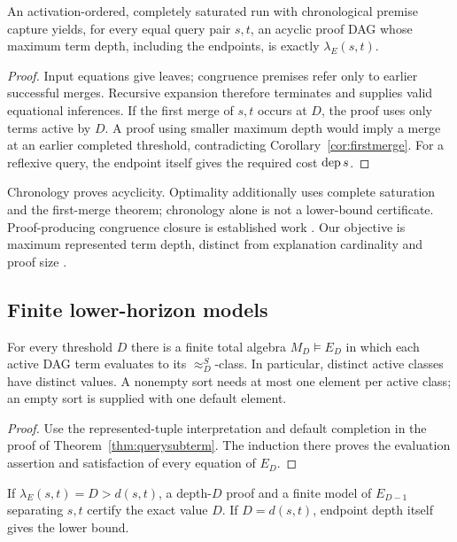 \begin{proposition}\label{prop:proofdag}
An activation-ordered, completely saturated run with chronological premise capture yields, for every equal query pair $s,t$, an acyclic proof DAG whose maximum term depth, including the endpoints, is exactly $\lambda_E(s,t)$.
\end{proposition}
\begin{proof}
Input equations give leaves; congruence premises refer only to earlier successful merges. Recursive expansion therefore terminates and supplies valid equational inferences. If the first merge of $s,t$ occurs at $D$, the proof uses only terms active by $D$. A proof using smaller maximum depth would imply a merge at an earlier completed threshold, contradicting Corollary~\ref{cor:firstmerge}. For a reflexive query, the endpoint itself gives the required cost $\operatorname{dep} s$.
\end{proof}

Chronology proves acyclicity. Optimality additionally uses complete saturation and the first-merge theorem; chronology alone is not a lower-bound certificate. Proof-producing congruence closure is established work \cite{NieuwenhuisOliveras2005,NieuwenhuisOliveras2007}. Our objective is maximum represented term depth, distinct from explanation cardinality and proof size \cite{FellnerFontainePaleo2017,FlattEtAl2022}.

\subsection{Finite lower-horizon models}
\begin{theorem}\label{thm:thresholdmodel}
For every threshold $D$ there is a finite total algebra $M_D\models E_D$ in which each active DAG term evaluates to its $\approx_D^S$-class. In particular, distinct active classes have distinct values. A nonempty sort needs at most one element per active class; an empty sort is supplied with one default element.
\end{theorem}
\begin{proof}
Use the represented-tuple interpretation and default completion in the proof of Theorem~\ref{thm:querysubterm}. The induction there proves the evaluation assertion and satisfaction of every equation of $E_D$.
\end{proof}

\begin{corollary}\label{cor:twosided}
If $\lambda_E(s,t)=D>d(s,t)$, a depth-$D$ proof and a finite model of $E_{D-1}$ separating $s,t$ certify the exact value $D$. If $D=d(s,t)$, endpoint depth itself gives the lower bound.
\end{corollary}

